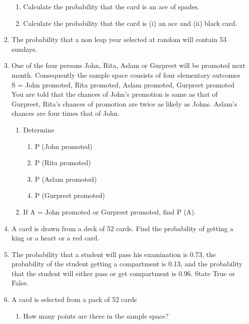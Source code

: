\begin{enumerate}[label=\thesection.\arabic*,ref=\thesection.\theenumi]
\begin{enumerate}[label=(\alph*)]
    \item Calculate the probability that the card is an ace of spades.
    \item Calculate the probability that the card is (i) an ace and (ii) black card.
\end{enumerate}
\solution
%
\item The probability that a non leap year selected at random will contain 53 sundays.
\\
\solution
%
\item One of the four persons John, Rita, Aslam or Gurpreet will be promoted next
month. Consequently the sample space consists of four elementary outcomes
S = {John promoted, Rita promoted, Aslam promoted, Gurpreet promoted}
You are told that the chances of John’s promotion is same as that of Gurpreet,
Rita’s chances of promotion are twice as likely as Johns. Aslam’s chances are
four times that of John.
\begin{enumerate}
	\item Determine
	\begin{enumerate}
		\item P (John promoted)
		\item P (Rita promoted)
		\item P (Aslam promoted)
		\item P (Gurpreet promoted)
	\end{enumerate}
	\item If A = {John promoted or Gurpreet promoted}, find P (A).
\end{enumerate}
\solution
%
\item A card is drawn from a deck of 52 cards. Find the probability of getting a king or a heart or a red card.\\
\solution
%
\item The probability that a student will pass his examination is 0.73, the probability of
the student getting a compartment is 0.13, and the probability that the student will
either pass or get compartment is 0.96. State True or False.\\
\solution
%
\item A card is selected from a pack of 52 cards\\
\begin{enumerate}[label=(\alph*)]
\item How many points are there in the sample space?

\end{enumerate}
\end{enumerate}
